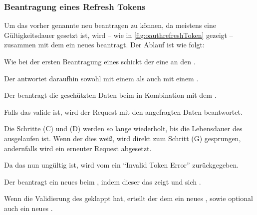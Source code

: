 	\subsubsection{Beantragung eines Refresh Tokens}\label{subsubsec:beantragung-eines-refresh-tokens}
		Um das vorher genannte \accessToken{} neu beantragen zu können,
		da meistens eine Gültigkeitsdauer gesetzt ist,
		wird -- wie in \vref{fig:oauthrefreshToken} gezeigt --
		zusammen mit dem  ein neues \accessToken{} beantragt.
		Der Ablauf ist wie folgt:

		\begin{compactenum}[(A)]
			\item Wie bei der ersten Beantragung eines \accessTokens{}
			schickt der \client{} eine 
			an den \hyperref[par:authorization-server]{\authorizationServer}.

			\item Der \hyperref[par:authorization-server]{\authorizationServer} antwortet daraufhin
			sowohl mit einem \accessToken{} als auch mit einem .

			\item Der \client{} beantragt die geschützten Daten beim \hyperref[par:resource-server]{\resourceServer}
			in Kombination mit dem \accessToken.

			\item Falls das \accessToken{} valide ist,
			wird der Request mit den angefragten Daten beantwortet.

			\item Die Schritte (C) und (D) werden so lange wiederholt,
			bis die Lebensdauer des \accessTokens{} ausgelaufen ist.
			Wenn der \client{} dies weiß,
			wird direkt zum Schritt (G) gesprungen,
			andernfalls wird ein erneuter Request abgesetzt.

			\item Da das \accessToken{} nun ungültig ist,
			wird vom \hyperref[par:resource-server]{\resourceServer} ein \enquote{Invalid Token Error} zurückgegeben.

			\item Der \client{} beantragt ein neues \accessToken{}
			beim \hyperref[par:authorization-server]{\authorizationServer},
			indem dieser das  zeigt und sich .

			\item Wenn die Validierung des  geklappt hat,
			erteilt der \hyperref[par:authorization-server]{\authorizationServer} dem \clienten{}
			ein neues \accessToken,
			sowie optional auch ein neues .

		\end{compactenum}